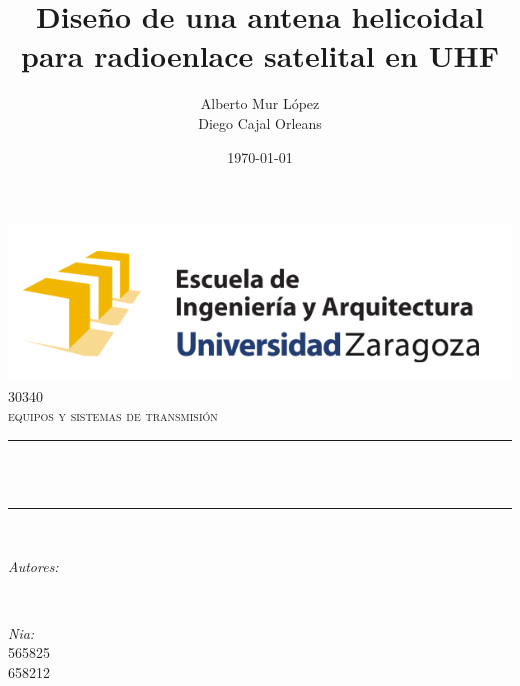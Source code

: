 \documentclass[12pt]{article}
\title{Diseño de una antena helicoidal \\para radioenlace satelital en UHF}								%
\author{Alberto Mur López \\ Diego Cajal Orleans}								%
\date{\today}											%
\makeatletter
\let\thetitle\@title
\let\theauthor\@author
\let\thedate\@date
\makeatother
\begin{document}

\begin{titlepage}
	\centering
    \vspace*{0.5 cm}
    \includegraphics[scale = 0.75]{eina.png}\\[1.0 cm]	%
	\textsc{\Large 30340}\\[0.5 cm]				%
	\textsc{\large equipos y sistemas de transmisión}\\[0.5 cm]				%
	\rule{\linewidth}{0.2 mm} \\[0.4 cm]
	\setlength{\baselineskip}{2\baselineskip}
	{ \huge \bfseries \thetitle}\\
	\rule{\linewidth}{0.2 mm} \\[1.5 cm]
	
	\begin{minipage}{0.4\textwidth}
		\begin{flushleft} \large
			\emph{Autores:}\\
			\theauthor
			\end{flushleft}
			\end{minipage}~
			\begin{minipage}{0.4\textwidth}
			\begin{flushright} \large
			\emph{Nia:} \\
			565825 \\
			658212
		\end{flushright}
	\end{minipage}\\[2 cm]
	
	{\large \thedate}\\[2 cm]
 
	\vfill
	
\end{titlepage}

\end{document}
